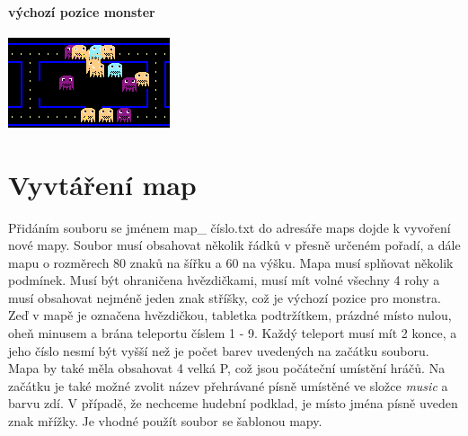 \documentclass[10pt,a4paper]{article}
\begin{document}
\paragraph{výchozí pozice monster}
\begin{center}
\includegraphics[scale=0.7]{images/monsters.png}
\end{center}
\section{Vyvtáření map}
Přidáním souboru se jménem map\_ číslo.txt do adresáře maps dojde k vyvoření nové mapy. Soubor musí obsahovat několik řádků v přesně určeném pořadí, a dále mapu o rozměrech 80 znaků na šířku a 60 na výšku. Mapa musí splňovat několik podmínek. Musí být ohraničena hvězdičkami, musí mít volné všechny 4 rohy a musí obsahovat nejméně jeden znak stříšky, což je výchozí pozice pro monstra. Zeď v mapě je označena hvězdičkou, tabletka podtržítkem, prázdné místo nulou, oheň minusem a brána teleportu číslem 1 - 9. Každý teleport musí mít 2 konce, a jeho číslo nesmí být vyšší než je počet barev uvedených na začátku souboru. Mapa by také měla obsahovat 4 velká P, což jsou počáteční umístění hráčů. Na začátku je také možné zvolit název přehrávané písně umístěné ve složce \textit{music} a barvu zdí. V případě, že nechceme hudební podklad, je místo jména písně uveden znak mřížky. Je vhodné použít soubor se šablonou mapy.
\end{document}
